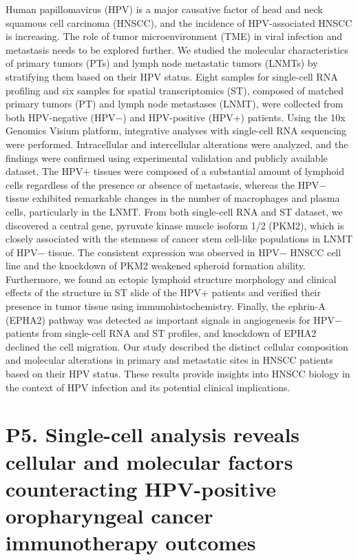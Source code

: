 \noindent
Human papillomavirus (HPV) is a major causative factor of head and neck squamous cell carcinoma (HNSCC), and the incidence of HPV-associated HNSCC is increasing. The role of tumor microenvironment (TME) in viral infection and metastasis needs to be explored further. We studied the molecular characteristics of primary tumors (PTs) and lymph node metastatic tumors (LNMTs) by stratifying them based on their HPV status. Eight samples for single-cell RNA profiling and six samples for spatial transcriptomics (ST), composed of matched primary tumors (PT) and lymph node metastases (LNMT), were collected from both HPV-negative (HPV−) and HPV-positive (HPV+) patients. Using the 10x Genomics Visium platform, integrative analyses with single-cell RNA sequencing were performed. Intracellular and intercellular alterations were analyzed, and the findings were confirmed using experimental validation and publicly available dataset. The HPV+ tissues were composed of a substantial amount of lymphoid cells regardless of the presence or absence of metastasis, whereas the HPV− tissue exhibited remarkable changes in the number of macrophages and plasma cells, particularly in the LNMT. From both single-cell RNA and ST dataset, we discovered a central gene, pyruvate kinase muscle isoform 1/2 (PKM2), which is closely associated with the stemness of cancer stem cell-like populations in LNMT of HPV− tissue. The consistent expression was observed in HPV− HNSCC cell line and the knockdown of PKM2 weakened spheroid formation ability. Furthermore, we found an ectopic lymphoid structure morphology and clinical effects of the structure in ST slide of the HPV+ patients and verified their presence in tumor tissue using immunohistochemistry. Finally, the ephrin-A (EPHA2) pathway was detected as important signals in angiogenesis for HPV− patients from single-cell RNA and ST profiles, and knockdown of EPHA2 declined the cell migration. Our study described the distinct cellular composition and molecular alterations in primary and metastatic sites in HNSCC patients based on their HPV status. These results provide insights into HNSCC biology in the context of HPV infection and its potential clinical implications.
\newpage


\section*{P5. Single-cell analysis reveals cellular and molecular factors counteracting HPV-positive oropharyngeal cancer immunotherapy outcomes}

